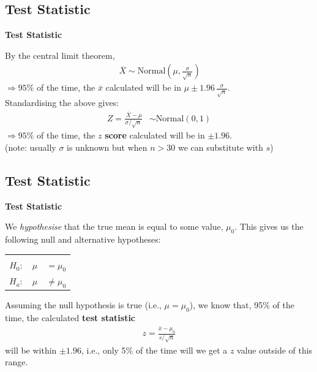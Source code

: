 \documentclass[compress]{beamer}        %
\makeatletter
\newcommand{\tcb}{\textcolor{beamer@blendedblue}}
\makeatother
\begin{document}
\subsection{Test Statistic}
\begin{frame}{\bf \tcb{Test Statistic}}

By the central limit theorem,
\begin{align*}
\,\overline{\!X} \sim \text{Normal}\left(\mu,\frac{\sigma}{\sqrt{n}}\right) \end{align*}
$\Rightarrow 95\%$  of the time, the $\bar x$  calculated will be in $\mu \pm 1.96\,\frac{\sigma}{\sqrt{n}}$.\\[0.8cm]
Standardising the above gives:
\begin{align*}
Z = \frac{\,\overline{\!X}-\mu}{\sigma / \sqrt{n}} &\sim \text{Normal}\left(0,1\right)
\end{align*}
$\Rightarrow 95\%$  of the time, the {\boldmath$z$} {\bf score} calculated will be in $\pm 1.96$.\\[0.7cm]

{\footnotesize(note: usually $\sigma$ is unknown but when $n > 30$ we can substitute with $s$)}

\end{frame}


\subsection{Test Statistic}
\begin{frame}{\bf \tcb{Test Statistic}}

We \emph{hypothesise} that the true mean is equal to some value, $\mu_0$. This gives us the following null and alternative hypotheses:
\begin{center}
\begin{tabular}{|c@{\,\,}c|}
\hline
&\\[-0.4cm]
$H_0: \quad \mu$ & $= \mu_0$ \\[0.2cm]
$H_a: \quad \mu$ &  $\ne \mu_0$ \\[0.1cm]
\hline
\end{tabular}
\end{center}

Assuming the null hypothesis is true (i.e., $\mu = \mu_0$), we know that, 95\% of the time, the calculated {\bf test statistic}
\begin{align*}
\boxed{z = \frac{\bar x -\mu_0}{s / \sqrt{n}}}
\end{align*}
will be within $\pm 1.96$, i.e., only 5\% of the time will we get a $z$ value outside of this range.

\end{frame}
\end{document}
